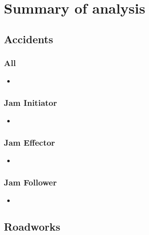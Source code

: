 \chapter{Summary of analysis}


\section{Accidents}

\subsection{All}

\begin{itemize}
    \item 
\end{itemize}

\subsection{Jam Initiator}

\begin{itemize}
    \item 
\end{itemize}

\subsection{Jam Effector}

\begin{itemize}
    \item 
\end{itemize}

\subsection{Jam Follower}

\begin{itemize}
    \item 
\end{itemize}

\section{Roadworks}


